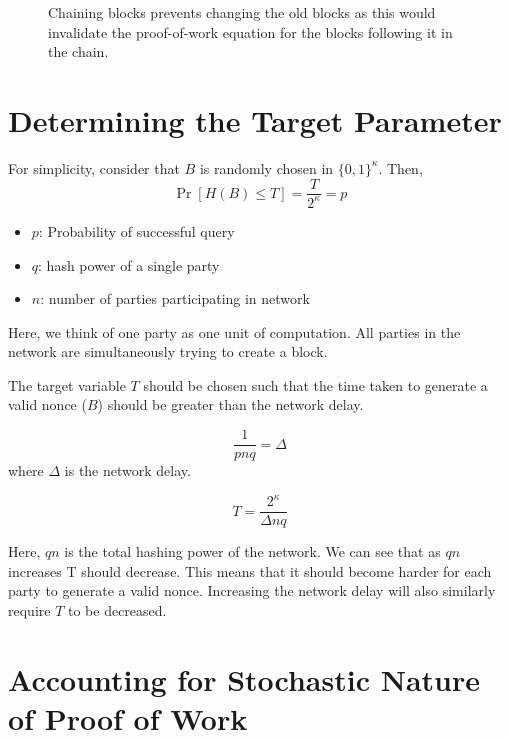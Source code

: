 \begin{figure}[H]
	\caption{Chaining blocks prevents changing the old blocks as this would invalidate the proof-of-work equation for the blocks following it in the chain.}
	\label{fig:Blockchain}  %
\end{figure}

\section{Determining the Target Parameter}
For simplicity, consider that $B$ is randomly chosen in $\{0,1\}^\kappa$. Then,
\begin{equation}
    \Pr[H(B) \leq T] = {\frac{T}{2^\kappa}} = p
\end{equation}
\begin{itemize}
\item $p$: Probability of successful query
\item $q$: hash power of a single party
\item $n$: number of parties participating in network
\end{itemize}

Here, we think of one party as one unit of computation. All parties in the network are simultaneously trying to create a block.

The target variable $T$ should be chosen such that the time taken to generate a valid nonce ($B$) should be greater than the network delay.

\begin{equation}
    \frac{1}{pnq} = \Delta
\end{equation}
where $\Delta$ is the network delay.

\begin{equation}
    T = \frac{2^\kappa}{\Delta nq}
\end{equation}

Here, $qn$ is the total hashing power of the network. We can see that as $qn$ increases T should decrease. This means that it should become harder for each party to generate a valid nonce.
Increasing the network delay will also similarly require $T$ to be decreased.

\section{Accounting for Stochastic Nature of Proof of Work}

